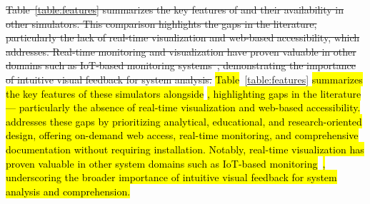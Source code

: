 \documentclass{ieeeaccess}
\begin{document}
\sout{Table~\mbox{\ref{table:features}} summarizes the key features of \eyanassdsim and their availability in other simulators. This comparison highlights the gaps in the literature, particularly the lack of real-time visualization and web-based accessibility, which \eyanassdsim addresses. Real-time monitoring and visualization have proven valuable in other domains such as IoT-based monitoring systems~\mbox{\cite{irrigation-wsn-ieee}}, demonstrating the importance of intuitive visual feedback for system analysis.} \hl{Table}~\ref{table:features} \hl{summarizes the key features of these simulators alongside} \eyanassdsim\hl{, highlighting gaps in the literature --- particularly the absence of real-time visualization and web-based accessibility.} \eyanassdsim \hl{addresses these gaps by prioritizing analytical, educational, and research-oriented design, offering on-demand web access, real-time monitoring, and comprehensive documentation without requiring installation. Notably, real-time visualization has proven valuable in other system domains such as IoT-based monitoring}~\cite{irrigation-wsn-ieee}\hl{, underscoring the broader importance of intuitive visual feedback for system analysis and comprehension.}
\end{document}
